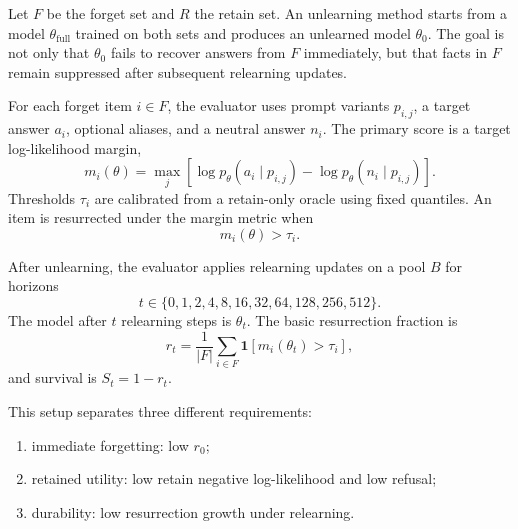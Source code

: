 Let $F$ be the forget set and $R$ the retain set.
An unlearning method starts from a model $\theta_{\mathrm{full}}$ trained on both sets and produces an unlearned model $\theta_0$.
The goal is not only that $\theta_0$ fails to recover answers from $F$ immediately, but that facts in $F$ remain suppressed after subsequent relearning updates.

For each forget item $i \in F$, the evaluator uses prompt variants $p_{i,j}$, a target answer $a_i$, optional aliases, and a neutral answer $n_i$.
The primary score is a target log-likelihood margin,
\[
  m_i(\theta) = \max_j \left[\log p_{\theta}(a_i \mid p_{i,j}) - \log p_{\theta}(n_i \mid p_{i,j})\right].
\]
Thresholds $\tau_i$ are calibrated from a retain-only oracle using fixed quantiles.
An item is resurrected under the margin metric when
\[
  m_i(\theta) > \tau_i.
\]

After unlearning, the evaluator applies relearning updates on a pool $B$ for horizons
\[
  t \in \{0,1,2,4,8,16,32,64,128,256,512\}.
\]
The model after $t$ relearning steps is $\theta_t$.
The basic resurrection fraction is
\[
  r_t = \frac{1}{|F|}\sum_{i \in F} \mathbf{1}[m_i(\theta_t) > \tau_i],
\]
and survival is $S_t = 1-r_t$.

This setup separates three different requirements:

\begin{enumerate}[leftmargin=*]
  \item immediate forgetting: low $r_0$;
  \item retained utility: low retain negative log-likelihood and low refusal;
  \item durability: low resurrection growth under relearning.
\end{enumerate}
